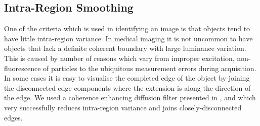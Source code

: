 \documentclass[a4paper,11pt]{ijamas}
\begin{document}
\subsection{Intra-Region Smoothing}
\label{sec:proposed_ced}

One of the criteria which is used in identifying an image is that objects tend to have little intra-region variance. In medical imaging it is not uncommon to have objects that lack a definite coherent boundary with large luminance variation. This is caused by number of reasons which vary from improper excitation, non-fluorescence of particles to the ubiquitous measurement errors during acquisition. In some cases it is easy to visualise the completed edge of the object by joining the disconnected edge components where the extension is along the direction of the edge.
We used a coherence enhancing diffusion filter presented in \cite{jweickert:1999}, \cite{jweickert:2002} and \cite{jweickert:1998} which very successfully reduces intra-region variance and joins closely-disconnected edges.
\end{document}
